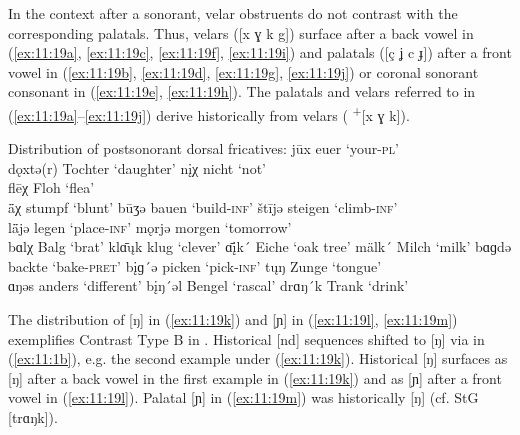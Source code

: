 In the context after a sonorant, velar obstruents do not contrast with the corresponding palatals. Thus, velars ([x ɣ k g]) surface after a back vowel in (\ref{ex:11:19a}, \ref{ex:11:19c}, \ref{ex:11:19f}, \ref{ex:11:19i}) and palatals ([ç ʝ c ɟ]) after a front vowel in (\ref{ex:11:19b}, \ref{ex:11:19d}, \ref{ex:11:19g}, \ref{ex:11:19j}) or coronal sonorant consonant in (\ref{ex:11:19e}, \ref{ex:11:19h}). The palatals and velars referred to in (\ref{ex:11:19a}--\ref{ex:11:19j}) derive historically from velars ( \textsuperscript{+}[x ɣ k]).

\ea%
\label{ex:11:19}Distribution of postsonorant dorsal fricatives:
\ea\label{ex:11:19a} jūx \tab [ʝuːx] \tab euer \tab ‘your\textsc{{}-pl}’ \\
    dǫxtə(r) \tab [dɔxtə(r)] \tab Tochter \tab ‘daughter’ 
\ex\label{ex:11:19b} n\k{i}χ \tab [nɪç] \tab  nicht \tab ‘not’ \\
    flēχ \tab [fleːç] \tab Floh \tab ‘flea’ \\
    ǟχ \tab [æːç] \tab stumpf \tab ‘blunt’ 
\ex\label{ex:11:19c} būʒə \tab [buːɣə] \tab bauen \tab ‘build\textsc{{}-inf}’ 
\ex\label{ex:11:19d} štījə \tab [ʃtiːʝə] \tab steigen \tab ‘climb\textsc{{}-inf}’ \\
    lǟjə \tab [læːʝə] \tab legen \tab ‘place\textsc{{}-inf}’ 
\ex\label{ex:11:19e} mǫrjə \tab [mɔrʝə] \tab morgen \tab ‘tomorrow’ \\
    bɑlχ \tab [bɑlç] \tab Balg \tab ‘brat’ 
\ex\label{ex:11:19f} klɑ̄ųk \tab [klɑːuk] \tab klug \tab ‘clever’ 
\ex\label{ex:11:19g} ɑ̄\k{i}k´ \tab [ɑːic] \tab Eiche \tab ‘oak tree’ 
\ex\label{ex:11:19h} mälk´ \tab [mælc] \tab Milch \tab ‘milk’ 
\ex\label{ex:11:19i} bɑɡdə \tab [bɑgdə] \tab backte \tab ‘bake\textsc{{}-pret}’ 
\ex\label{ex:11:19j} b\k{i}ɡ´ə \tab [bɪɟə] \tab picken \tab ‘pick\textsc{{}-inf}’ 
\ex\label{ex:11:19k} tųŋ \tab [tʊŋ] \tab Zunge \tab ‘tongue’ \\
    ɑŋəs \tab [ɑŋəs] \tab anders \tab ‘different’ 
\ex\label{ex:11:19l} b\k{i}ŋ´əl \tab [bɪɲəl] \tab Bengel \tab ‘rascal’ 
\ex\label{ex:11:19m} drɑŋ´k \tab [drɑɲc] \tab Trank \tab ‘drink’ 
    \z
\z 

The distribution of [ŋ] in (\ref{ex:11:19k}) and [ɲ] in (\ref{ex:11:19l}, \ref{ex:11:19m}) exemplifies Contrast Type B in . Historical [nd] sequences shifted to [ŋ] via  in (\ref{ex:11:1b}), e.g. the second example under (\ref{ex:11:19k}). Historical [ŋ] surfaces as [ŋ] after a back vowel in the first example in (\ref{ex:11:19k}) and as [ɲ] after a front vowel in (\ref{ex:11:19l}). Palatal [ɲ] in (\ref{ex:11:19m}) was historically [ŋ] (cf. StG [trɑŋk]).

